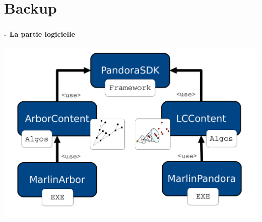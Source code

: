 \documentclass[8pt]{beamer}
\begin{document}

  \section*{Backup}

  \begin{frame}
  \frametitle{\secname}
  \framesubtitle{\subsecname - La partie logicielle}
    \begin{center}
      \includegraphics[width=\linewidth]{ArborSoftwareView.pdf}
    \end{center}
  \end{frame}
\end{document}
